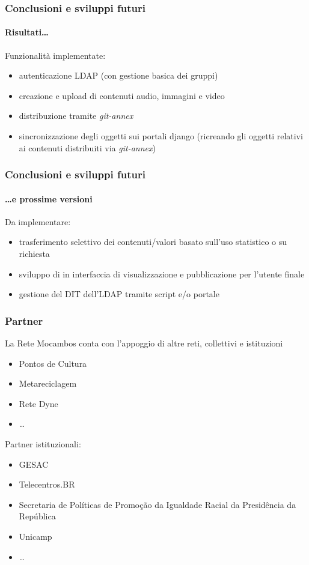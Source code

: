 \documentclass{beamer}
\begin{document}
\begin{frame}
 \frametitle{Conclusioni e sviluppi futuri}
  \framesubtitle{Risultati\ldots}
  Funzionalità implementate:
  \begin{itemize}
  \item autenticazione LDAP (con gestione basica dei gruppi)
  \item creazione e upload di contenuti audio, immagini e video
  \item distribuzione tramite \emph{git-annex}
  \item sincronizzazione degli oggetti sui portali django (ricreando
    gli oggetti relativi ai contenuti distribuiti via
    \emph{git-annex})
  \end{itemize}
\end{frame}
  
\begin{frame}
 \frametitle{Conclusioni e sviluppi futuri}
  \framesubtitle{\ldots e prossime versioni}
 
  Da implementare:
  \begin{itemize}
  \item trasferimento selettivo dei contenuti/valori basato sull'uso
    statistico o su richiesta
  \item sviluppo di in interfaccia di visualizzazione e pubblicazione
    per l'utente finale
  \item gestione del DIT dell'LDAP tramite script e/o portale
  \end{itemize}
\end{frame}

\begin{frame}
 \frametitle{Partner}
 La Rete Mocambos conta con l'appoggio di altre reti, collettivi e istituzioni
  
  \begin{itemize}
  \item Pontos de Cultura 
  \item Metareciclagem
  \item Rete Dyne 
  \item \ldots
  \end{itemize}
  
  Partner istituzionali:
  \begin{itemize}
  \item GESAC
  \item Telecentros.BR
  \item Secretaria de Políticas de Promoção da Igualdade Racial da
    Presidência da República
  \item Unicamp 
  \item \ldots
  \end{itemize}
  
\end{frame}
\end{document}

